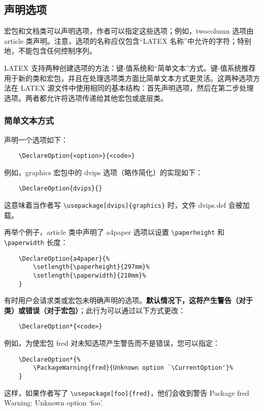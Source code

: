 \subsection{声明选项}\label{subsec:cls-decl-opt}
宏包和文档类可以声明选项，作者可以指定这些选项；例如，twocolumn 选项由 article 类声明。注意，选项的名称应仅包含“LATEX 名称”中允许的字符；特别地，不能包含任何控制序列。

LATEX 支持两种创建选项的方法：键-值系统和“简单文本”方式。键-值系统推荐用于新的类和宏包，并且在处理选项类方面比简单文本方式更灵活。这两种选项方法在 LATEX 源文件中使用相同的基本结构：首先声明选项，然后在第二步处理选项。两者都允许将选项传递给其他宏包或底层类。

\subsubsection{简单文本方式}\label{subsubsec:cls-decl-opt-simple}
声明一个选项如下：
\begin{lstlisting}
    \DeclareOption{<option>}{<code>}
\end{lstlisting}

例如，graphics 宏包中的 dvips 选项（略作简化）的实现如下：
\begin{lstlisting}
    \DeclareOption{dvips}{}
\end{lstlisting}

这意味着当作者写 \lstinline|\usepackage[dvips]{graphics}| 时，文件 dvips.def 会被加载。

再举个例子，article 类中声明了 a4paper 选项以设置 \lstinline|\paperheight| 和 \lstinline|\paperwidth| 长度：
\begin{lstlisting}
    \DeclareOption{a4paper}{%
        \setlength{\paperheight}{297mm}%
        \setlength{\paperwidth}{210mm}%
    }
\end{lstlisting}

有时用户会请求类或宏包未明确声明的选项。\textbf{默认情况下，这将产生警告（对于类）或错误（对于宏包）}；此行为可以通过以下方式更改：
\begin{lstlisting}
    \DeclareOption*{<code>}
\end{lstlisting}

例如，为使宏包 fred 对未知选项产生警告而不是错误，您可以指定：
\begin{lstlisting}
    \DeclareOption*{%
        \PackageWarning{fred}{Unknown option `\CurrentOption'}%
    }
\end{lstlisting}
这样，如果作者写了 \lstinline|\usepackage[foo]{fred}|，他们会收到警告 Package fred Warning: Unknown option `foo'.

